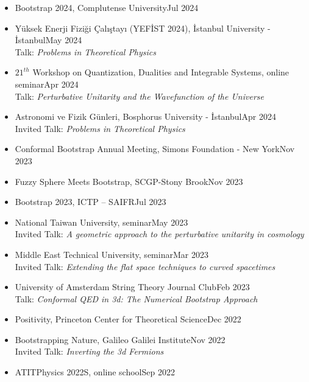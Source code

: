 \documentclass[a4paper,11pt]{article}
\begin{document}
\begin{itemize}[itemsep=.001em]
\item[] Bootstrap 2024, Complutense University\hfill Jul 2024
\\
	\item[] Yüksek Enerji Fiziği Çalıştayı (YEFİST 2024), İstanbul University - İstanbul\hfill May 2024
\\
\hspace*{1.8em}Talk: \emph{Problems in Theoretical Physics}
	\item[] $21^{th}$ Workshop on
Quantization, Dualities and Integrable Systems, online seminar\hfill Apr 2024
\\
\hspace*{1.8em}Talk: \emph{Perturbative Unitarity and the Wavefunction of the Universe}
	\item[] Astronomi ve Fizik Günleri, Bosphorus University - İstanbul\hfill Apr 2024
\\
\hspace*{1.8em}Invited Talk: \emph{Problems in Theoretical Physics}
	\item[] Conformal Bootstrap Annual Meeting, Simons Foundation - New York\hfill Nov 2023
	\item[] Fuzzy Sphere Meets Bootstrap, SCGP-Stony Brook\hfill Nov 2023
	\item[] Bootstrap 2023, ICTP – SAIFR\hfill Jul 2023
	\item[] National Taiwan University, seminar\hfill May 2023
\\
\hspace*{1.8em}Invited Talk: \emph{A geometric approach to the perturbative unitarity in cosmology}
	\item[] Middle East Technical University, seminar\hfill Mar 2023
\\
\hspace*{1.8em}Invited Talk: \emph{Extending the flat space techniques to curved spacetimes}
	\item[] University of Amsterdam String Theory Journal Club\hfill Feb 2023
\\
\hspace*{1.8em}Talk: \emph{Conformal QED in 3d: The Numerical Bootstrap Approach}
	\item[] Positivity, Princeton Center for Theoretical Science\hfill Dec 2022
	\item[] Bootstrapping Nature, Galileo Galilei Institute\hfill Nov 2022
\\
\hspace*{1.8em}Invited Talk: \emph{Inverting the 3d Fermions}
	\item[] ATITPhysics 2022S, online school\hfill Sep 2022\\

\end{itemize}
\end{document}
